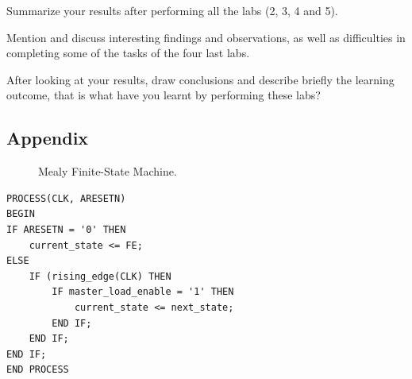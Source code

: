 \documentclass[a4paper,11pt]{article}
\begin{document}
Summarize your results after performing all the labs (2, 3, 4 and 5).

Mention and discuss interesting findings and observations, as well as difficulties in completing some of the tasks of the four last labs.

After looking at your results, draw conclusions and describe briefly the learning outcome, that is what have you learnt by performing these labs?  

\newpage
\begin{appendix}

\section{Appendix}

\begin{figure}[h]
\centering
{}
\caption{Mealy Finite-State Machine.}
\end{figure}
\vspace{1cm}
\begin{lstlisting}[frame=single]
PROCESS(CLK, ARESETN)
BEGIN
IF ARESETN = '0' THEN
    current_state <= FE;
ELSE
    IF (rising_edge(CLK) THEN
        IF master_load_enable = '1' THEN
            current_state <= next_state;
        END IF;
    END IF;
END IF;
END PROCESS    
\end{lstlisting}

\newpage


\end{appendix}
\end{document}
